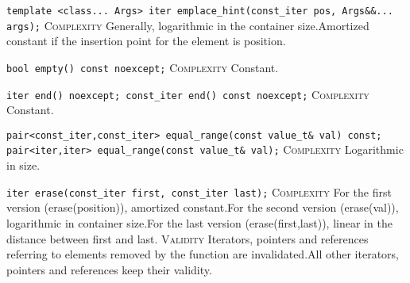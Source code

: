 \noindent{}\hspace*{0.25em}\lstinline[basicstyle=\ttfamily\color{clime}]{template <class... Args> iter emplace_hint(const_iter pos, Args&&... args);} \textsc{Complexity} Generally, logarithmic in the container size.Amortized constant if the insertion point for the element is position.\\\vspace{-0.6em}

\noindent{}\hspace*{0.25em}\lstinline[basicstyle=\ttfamily\color{cgreen}]{bool empty() const noexcept;} \textsc{Complexity} Constant.\\\vspace{-0.6em}

\noindent{}\hspace*{0.25em}\lstinline[basicstyle=\ttfamily\color{cgreen}]{iter end() noexcept; const_iter end() const noexcept;} \textsc{Complexity} Constant.\\\vspace{-0.6em}

\noindent{}\hspace*{0.25em}\lstinline[basicstyle=\ttfamily\color{clime}]{pair<const_iter,const_iter> equal_range(const value_t& val) const; pair<iter,iter> equal_range(const value_t& val);} \textsc{Complexity} Logarithmic in size.\\\vspace{-0.6em}

\noindent{}\hspace*{0.25em}\lstinline[basicstyle=\ttfamily\color{corange}]{iter erase(const_iter first, const_iter last);} \textsc{Complexity} For the first version (erase(position)), amortized constant.For the second version (erase(val)), logarithmic in container size.For the last version (erase(first,last)), linear in the distance between first and last. \textsc{Validity} Iterators, pointers and references referring to elements removed by the function are invalidated.All other iterators, pointers and references keep their validity.\\\vspace{-0.6em}

